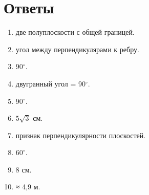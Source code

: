 \documentclass{umk-matematika}
\begin{document}
\section*{Ответы}

\begin{enumerate}
  \item две полуплоскости с общей границей.
  \item угол между перпендикулярами к ребру.
  \item 90$^\circ$.
  \item двугранный угол = 90$^\circ$.
  \item 90$^\circ$.
  \item $5\sqrt{3}$ см.
  \item признак перпендикулярности плоскостей.
  \item $60^\circ$.
  \item 8 см.
  \item ≈ 4,9 м.
\end{enumerate}
\end{document}
